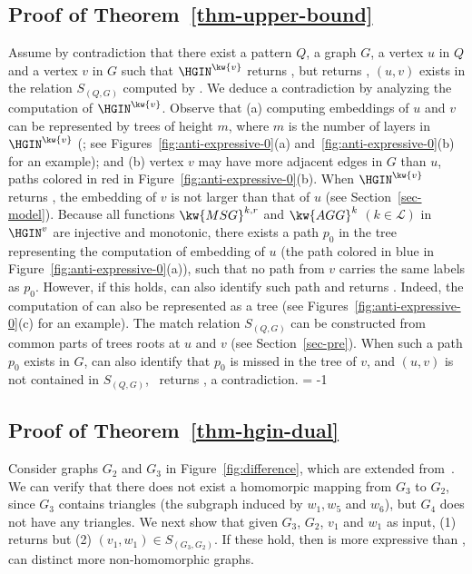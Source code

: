 \subsection{Proof of Theorem~\ref{thm-upper-bound}}
Assume by contradiction 
that there  exist a pattern $Q$, a graph $G$,
a vertex $u$ in $Q$ and a vertex $v$ in $G$ 
such that $\HGIN^\kw{v}$ returns \false, 
but \dual returns \true, \ie $(u, v)$ exists
in the relation $S_{(Q, G)}$ computed by \dual.
We deduce a contradiction by analyzing 
the computation of $\HGIN^\kw{v}$.
Observe that
(a) computing
embeddings of $u$ and $v$ can be represented by
trees of height $m$, where $m$ is 
the number of layers in $\HGIN^\kw{v}$
(\cite{Gen-bound}; see Figures~\ref{fig:anti-expressive-0}(a) and~\ref{fig:anti-expressive-0}(b)
for an example);
and (b) vertex $v$ may have more 
adjacent edges in $G$ than $u$, 
\eg paths colored in red in Figure~\ref{fig:anti-expressive-0}(b).
When $\HGIN^\kw{v}$ returns \false, 
the embedding of $v$ is not larger than that of $u$
(see Section~\ref{sec-model}).
Because all functions $\kw{MSG}^{k,r}$ and $\kw{AGG}^k$
$(k\in \mathcal{L})$ in $\HGIN^v$
are injective and monotonic,
there exists a path $p_0$ in the tree representing the computation of 
embedding of $u$ (\eg the path colored in blue
in Figure~\ref{fig:anti-expressive-0}(a)), such that 
no path from $v$ carries the same labels as $p_0$.
However, if this holds, \dual can also identify 
such path and returns \false.
Indeed, the computation of \dual can also be represented
as a tree (see Figures~\ref{fig:anti-expressive-0}(c)
for an example).
The match relation $S_{(Q, G)}$
can be constructed from common parts 
of trees roots at $u$ and $v$ (see Section~\ref{sec-pre}).
When such a path $p_0$ exists in $G$, \dual can also identify 
that $p_0$ is missed in the tree of $v$, 
and $(u, v)$ is not contained in $S_{(Q, G)}$, 
\ie~\dual returns \false, a contradiction.
\looseness = -1






\subsection{Proof of Theorem~\ref{thm-hgin-dual}}
	Consider graphs $G_2$ and $G_3$ in Figure~\ref{fig:difference}, 
	which are extended from~\cite{you2021identity}.
	We can verify that 
	there does not exist a homomorpic mapping 
	from $G_3$ to $G_2$, since $G_3$ contains
	triangles (\ie the subgraph induced by 
	$w_1, w_5$ and $w_6$), but $G_4$ does not have any triangles.
    We next show that
    given $G_3$, $G_2$, $v_1$
    and $w_1$ as input,
     (1) \HGIN returns \false 
    but (2) $(v_1, w_1)\in S_{(G_3,G_2)}$.
    If these hold, then 
    \HGIN is more expressive than \dual,
    \ie \HGIN can distinct more non-homomorphic
    graphs.

